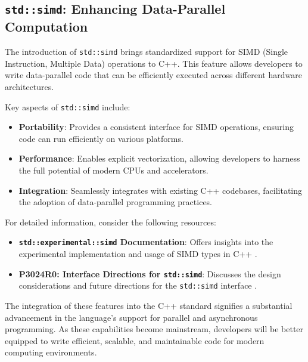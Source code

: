 \subsection{\texttt{std::simd}: Enhancing Data-Parallel Computation}

The introduction of \texttt{std::simd} brings standardized support for SIMD (Single Instruction, Multiple
Data) operations to C++. This feature allows developers to write data-parallel code that can be efficiently
executed across different hardware architectures.

Key aspects of \texttt{std::simd} include:

\begin{itemize}
    \item \textbf{Portability}: Provides a consistent interface for SIMD operations, ensuring code can run
          efficiently on various platforms.
    \item \textbf{Performance}: Enables explicit vectorization, allowing developers to harness the full
          potential of modern CPUs and accelerators.
    \item \textbf{Integration}: Seamlessly integrates with existing C++ codebases, facilitating the adoption
          of data-parallel programming practices.
\end{itemize}

For detailed information, consider the following resources:

\begin{itemize}
    \item \textbf{\texttt{std::experimental::simd} Documentation}: Offers insights into the experimental
          implementation and usage of SIMD types in C++ \cite{simd_cppreference}.
    \item \textbf{P3024R0: Interface Directions for \texttt{std::simd}}: Discusses the design considerations
          and future directions for the \texttt{std::simd} interface \cite{p3024r0}.
\end{itemize}

The integration of these features into the C++ standard signifies a substantial advancement in the language's
support for parallel and asynchronous programming. As these capabilities become mainstream, developers will
be better equipped to write efficient, scalable, and maintainable code for modern computing environments.
